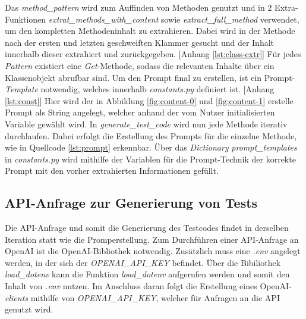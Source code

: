 \vspace{-.3cm}
Das \textit{method\_pattern} wird zum Auffinden von Methoden genutzt und in 2 Extra-Funktionen \textit{extrat\_methods\_with\_content} sowie \textit{extract\_full\_method} verwendet, um den kompletten Methodeninhalt zu extrahieren. Dabei wird in der Methode nach der ersten und letzten geschweiften Klammer gesucht und der Inhalt innerhalb dieser extrahiert und zurückgegeben. [Anhang \ref{lst:class-extr}] Für jedes \textit{Pattern} existiert eine \textit{Get}-Methode, sodass die relevanten Inhalte über ein Klassenobjekt abrufbar sind. Um den Prompt final zu erstellen, ist ein Prompt-\textit{Template} notwendig, welches innerhalb \textit{constants.py} definiert ist. [Anhang \ref{lst:const}] Hier wird der in Abbildung \ref{fig:content-0} und \ref{fig:content-1} erstelle Prompt als String angelegt, welcher anhand der vom Nutzer initialisierten Variable gewählt wird. In \textit{generate\_test\_code} wird nun jede Methode iterativ durchlaufen. Dabei erfolgt die Erstellung des Prompts für die einzelne Methode, wie in Quellcode \ref{lst:prompt} erkennbar. Über das \textit{Dictionary} \textit{prompt\_templates} in \textit{constants.py} wird mithilfe der Variablen für die Prompt-Technik der korrekte Prompt mit den vorher extrahierten Informationen gefüllt.\\
\vspace{-.3cm}

\subsection{API-Anfrage zur Generierung von Tests}
Die API-Anfrage und somit die Generierung des Testcodes findet in derselben Iteration statt wie die Promperstellung. Zum Durchführen einer API-Anfrage an OpenAI ist die OpenAI-Bibliothek notwendig. Zusätzlich muss eine \textit{.env} angelegt werden, in der sich der \textit{OPENAI\_API\_KEY} befindet. Über die Bibiliothek \textit{load\_dotenv} kann die Funktion \textit{load\_dotenv} aufgerufen werden und somit den Inhalt von \textit{.env} nutzen. Im Anschluss daran folgt die Erstellung eines OpenAI-\textit{clients} mithilfe von \textit{OPENAI\_API\_KEY}, welcher für Anfragen an die API genutzt wird.